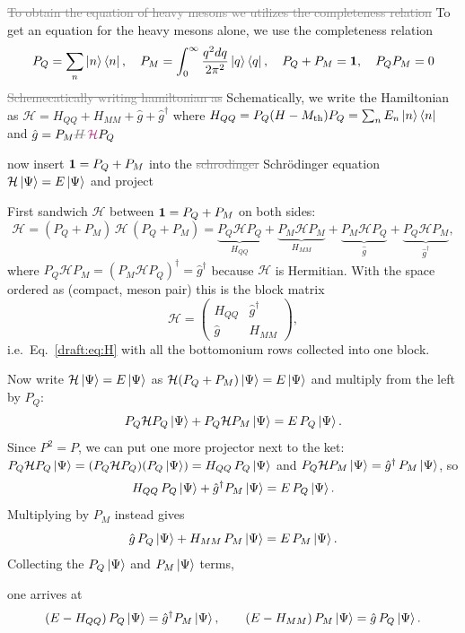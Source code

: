 \documentclass[11pt,a4paper]{article}
\newcommand{\ai}[1]{\textcolor{aicolor}{#1}}
\newcommand{\aifix}[2]{\textcolor{gray}{\sout{#1}} \textcolor{aicolor}{#2}}
\newcommand{\aifixm}[2]{\textcolor{gray}{\text{\sout{$#1$}}}\,\textcolor{aicolor}{#2}}
\newcommand{\ai}[1]{#1}
\newcommand{\aifix}[2]{#2}
\newcommand{\aifixm}[2]{#2}
\newenvironment{aiadd}{\par}{\par}
\begin{document}
\aifix{To obtain the equation of heavy mesons we utilizes the completeness relation}{To get an equation for the heavy mesons alone, we use the completeness relation}
\begin{equation}
	P_{Q} = \sum_n \ket{n}\bra{n}, \quad P_{M} = \int_0^\infty \frac{q^2dq}{2\pi^2}\ket{q}\bra{q},\quad P_Q + P_M = \bold{1},\quad P_Q P_M = 0
\end{equation}
\aifix{Schemecatically writing hamiltonian as}{Schematically, we write the Hamiltonian as} $\mathcal{H} = H_{QQ} + H_{MM} + \hat{g} + \hat{g}^\dagger$ where $H_{QQ} = P_Q(H-M_\text{th})P_Q = \sum_n E_n \ket{n}\bra{n}$ and $\hat{g} = P_M \aifixm{H}{\mathcal H} P_Q$

now insert $\bold{1} = P_Q + P_M$ into the \aifix{schrodinger}{Schr\"odinger} equation $\mathcal{H} \ket{\Psi} = E\ket{\Psi}$ and project

\begin{aiadd}
	First sandwich $\mathcal H$ between $\bold 1=P_Q+P_M$ on both sides:
	\[
		\mathcal H=(P_Q+P_M)\,\mathcal H\,(P_Q+P_M)
		=\underbrace{P_Q\mathcal HP_Q}_{H_{QQ}}+\underbrace{P_M\mathcal HP_M}_{H_{MM}}+\underbrace{P_M\mathcal HP_Q}_{\hat g}+\underbrace{P_Q\mathcal HP_M}_{\hat g^\dagger},
	\]
	where $P_Q\mathcal HP_M=(P_M\mathcal HP_Q)^\dagger=\hat g^\dagger$ because $\mathcal H$ is Hermitian. With the space ordered as (compact, meson pair) this is the block matrix
	\[
		\mathcal H=\begin{pmatrix}H_{QQ}&\hat g^\dagger\\ \hat g&H_{MM}\end{pmatrix},
	\]
	i.e.\ Eq.~\eqref{draft:eq:H} with all the bottomonium rows collected into one block.

	Now write $\mathcal H\ket\Psi=E\ket\Psi$ as $\mathcal H(P_Q+P_M)\ket\Psi=E\ket\Psi$ and multiply from the left by $P_Q$:
	\[
		P_Q\mathcal HP_Q\ket\Psi+P_Q\mathcal HP_M\ket\Psi=E\,P_Q\ket\Psi .
	\]
	Since $P^2=P$, we can put one more projector next to the ket: $P_Q\mathcal HP_Q\ket\Psi=(P_Q\mathcal HP_Q)(P_Q\ket\Psi)=H_{QQ}\,P_Q\ket\Psi$ and $P_Q\mathcal HP_M\ket\Psi=\hat g^\dagger\,P_M\ket\Psi$, so
	\[
		H_{QQ}\,P_Q\ket\Psi+\hat g^\dagger P_M\ket\Psi=E\,P_Q\ket\Psi .
	\]
	Multiplying by $P_M$ instead gives
	\[
		\hat g\,P_Q\ket\Psi+H_{MM}\,P_M\ket\Psi=E\,P_M\ket\Psi .
	\]
	Collecting the $P_Q\ket\Psi$ and $P_M\ket\Psi$ terms,
\end{aiadd}

one arrives \ai{at}
\begin{equation}
	(E-H_{QQ})\,P_Q\ket\Psi=\hat g^\dagger P_M\ket\Psi,\qquad
	(E-H_{MM})\,P_M\ket\Psi=\hat g\,P_Q\ket\Psi .
\end{equation}
\end{document}
